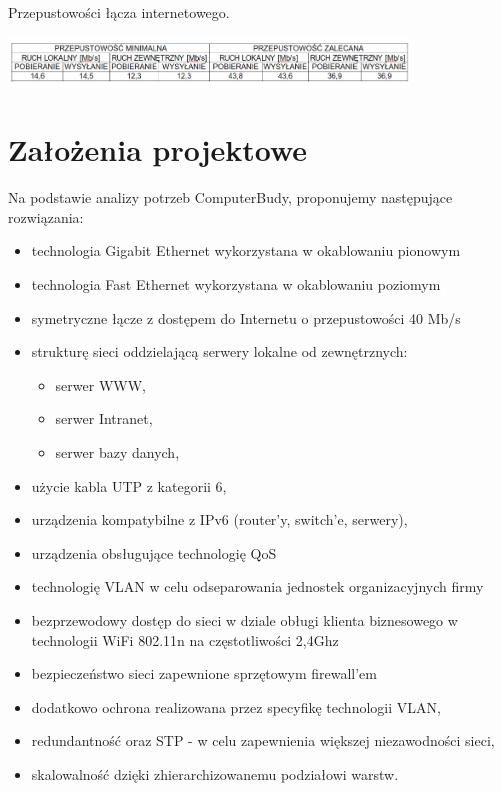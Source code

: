 \documentclass{report}
\begin{document}
\begin{table}[H]
\caption{Przepustowości łącza internetowego. }
\label{tab:parametry_loncza}
 \centering
      \includegraphics[width=0.8\textwidth]{./obrazki/ruch_tabele/loncze.png}
\end{table}


\chapter{Założenia projektowe}

Na podstawie analizy potrzeb ComputerBudy, proponujemy
następujące rozwiązania:

\begin{itemize}

\item{technologia Gigabit Ethernet wykorzystana w okablowaniu pionowym}

\item{technologia Fast Ethernet wykorzystana w okablowaniu poziomym}

\item{symetryczne łącze z dostępem do Internetu o przepustowości 40 Mb/s}

\item{strukturę sieci oddzielającą serwery lokalne od zewnętrznych:
 \begin{itemize}
\item serwer WWW,
\item serwer Intranet,
\item serwer bazy danych,
\end{itemize}}

\item {użycie kabla UTP z kategorii 6,}

\item {urządzenia kompatybilne z IPv6 (router’y, switch’e, serwery),}

\item {urządzenia obsługujące technologię QoS}

\item{technologię VLAN w celu odseparowania jednostek organizacyjnych firmy}

\item{bezprzewodowy dostęp do sieci w dziale obługi klienta biznesowego w technologii WiFi
802.11n na częstotliwości 2,4Ghz}

\item{bezpieczeństwo sieci zapewnione sprzętowym firewall’em}

\item{dodatkowo ochrona realizowana przez specyfikę technologii VLAN,}

\item{redundantność oraz STP - w celu zapewnienia większej niezawodności sieci,}

\item{skalowalność dzięki zhierarchizowanemu podziałowi warstw.}

\end{itemize}
\end{document}
